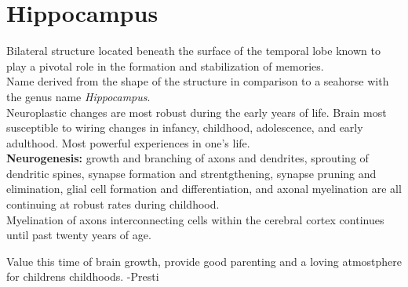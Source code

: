 \documentclass{article}
\begin{document}
\section{Hippocampus}
Bilateral structure located beneath the surface of the temporal lobe known to play a pivotal role in the formation and stabilization of memories. \\
Name derived from the shape of the structure in comparison to a seahorse with the genus name \textit{Hippocampus}. \\
Neuroplastic changes are most robust during the early years of life. Brain most susceptible to wiring changes in infancy, childhood, adolescence, and early adulthood. Most powerful experiences in one's life. \\
\textbf{Neurogenesis:} growth and branching of axons and dendrites, sprouting of dendritic spines, synapse formation and strentgthening, synapse pruning and elimination, glial cell formation and differentiation, and axonal myelination are all continuing at robust rates during childhood. \\
Myelination of axons interconnecting cells within the cerebral cortex continues until past twenty years of age. \\
\bigskip 

\begin{center}
    Value this time of brain growth, provide good parenting and a loving atmostphere for childrens childhoods. -Presti
\end{center}
\end{document}
